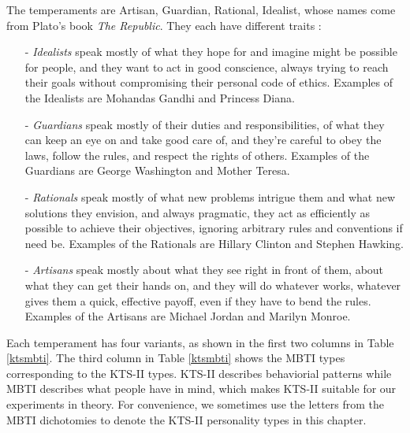 The temperaments are Artisan, Guardian, Rational, Idealist, whose names come from Plato's book \emph{The Republic}. They each have different traits \cite{keirseywebsite}:
\begin{itemize}
\item[-]\textit{Idealists} speak mostly of what they hope for and imagine might be possible for people, and they want to act in good conscience, always trying to reach their goals without compromising their personal code of ethics. Examples of the Idealists are Mohandas Gandhi and Princess Diana. 
\item[-]\textit{Guardians} speak mostly of their duties and responsibilities, of what they can keep an eye on and take good care of, and they're careful to obey the laws, follow the rules, and respect the rights of others. Examples of the Guardians are George Washington and Mother Teresa.   
\item[-]\textit{Rationals} speak mostly of what new problems intrigue them and what new solutions they envision, and always pragmatic, they act as efficiently as possible to achieve their objectives, ignoring arbitrary rules and conventions if need be. Examples of the Rationals are Hillary Clinton and Stephen Hawking.
\item[-]\textit{Artisans} speak mostly about what they see right in front of them, about what they can get their hands on, and they will do whatever works, whatever gives them a quick, effective payoff, even if they have to bend the rules. Examples of the Artisans are Michael Jordan and Marilyn Monroe.
\end{itemize}

Each temperament has four variants, as shown in the first two columns in Table \ref{ktsmbti}. The third column in Table \ref{ktsmbti} shows the MBTI types corresponding to the KTS-II types. KTS-II describes behaviorial patterns while MBTI describes what people have in mind, which makes KTS-II suitable for our experiments in theory. For convenience, we sometimes use the letters from the MBTI dichotomies to denote the KTS-II personality types in this chapter.  


